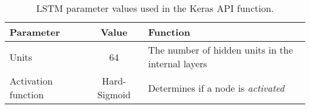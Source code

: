 
\begin{table}[ht!]
    \centering
    \caption{\ac{LSTM} parameter values used in the Keras API function.}
    \begin{tabular}{>{\raggedright}p{} | c | p{}}
        Parameter           & Value         & Function \\ \hline
        Units               & 64            & The number of hidden units in the internal layers\\
        Activation function & Hard-Sigmoid  & Determines if a node is \textit{activated}\\
    \end{tabular}
    \label{tab:lstm-parameters}
\end{table}